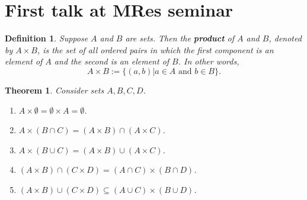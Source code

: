 \documentclass{article}
\newtheorem*{mydef}{Definition}
\newtheorem*{thm}{Theorem}
\begin{document}
\section{First talk at MRes seminar}
\label{sec:FirsttalkMRes}

\begin{mydef}\label{def:cartesianprod}
  Suppose $A$ and $B$ are sets. Then the \textbf{product} of $A$ and $B$, denoted by $A \times B$, is the set of all ordered pairs in which the first component is an element of $A$ and the second is an element of $B$. In other words,
  \begin{displaymath}
    A \times B := \{(a,b)  |  a \in A \text{ and }  b \in B \}.
  \end{displaymath}
\end{mydef}

\begin{thm}\label{thm:propprod}
  Consider sets $A, B, C, D$.
  \begin{enumerate}
  \item\label{thm:propprod5} $A \times \emptyset = \emptyset \times A = \emptyset$.
  \item\label{thm:propprod1} $A \times (B \cap C) = (A\times B) \cap (A \times C)$.
  \item\label{thm:propprod2} $A \times (B \cup C) = (A \times B) \cup (A \times C)$.
  \item\label{thm:propprod3} $(A \times B) \cap (C \times D) = (A \cap C) \times (B \cap D)$.
  \item\label{thm:propprod4} $(A \times B) \cup (C \times D) \subseteq (A \cup C) \times (B \cup D)$.
  \end{enumerate}
\end{thm}
\end{document}
